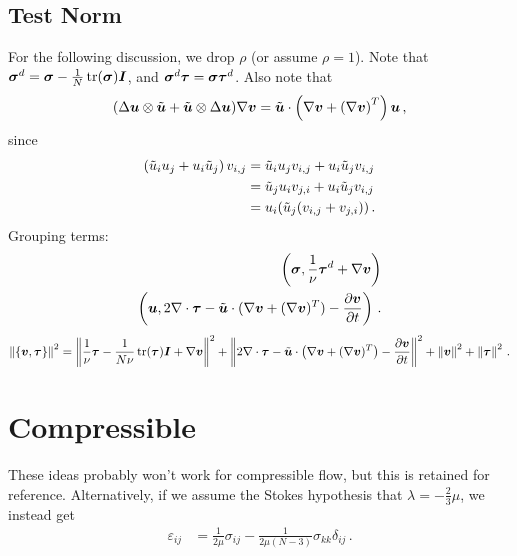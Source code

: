 \documentclass{article}
\begin{document}
\subsection*{Test Norm}
For the following discussion, we drop $\rho$ (or assume $\rho=1$).
Note that $\boldsymbol\sigma^d=\boldsymbol\sigma-\frac{1}{N}\operatorname*{tr}(\boldsymbol\sigma)\boldsymbol I$, and $\boldsymbol\sigma^d\boldsymbol\tau=\boldsymbol\sigma\boldsymbol\tau^d$.
Also note that 
\[
(\Delta\boldsymbol u\otimes\tilde{\boldsymbol u}+\tilde{\boldsymbol u}\otimes\Delta\boldsymbol u)\nabla\boldsymbol v=\tilde{\boldsymbol u}\cdot\left( \nabla\boldsymbol v+\left( \nabla\boldsymbol v \right)^T \right)\boldsymbol u\,,
\]
since
\begin{align*}
  \left( \tilde u_i u_j+u_i\tilde u_j \right)v_{i,j}&=\tilde u_i u_j v_{i,j}+u_i \tilde u_j v_{i,j}\\
  &=\tilde u_j u_i v_{j,i}+u_i \tilde u_j v_{i,j}\\
  &=u_i(\tilde u_j(v_{i,j}+v_{j,i}))\,.
\end{align*}
Grouping terms:
\begin{align*}
\left( \boldsymbol\sigma,\frac{1}{\nu}\boldsymbol\tau^d+\nabla\boldsymbol v \right)\\
\left( \boldsymbol u,2\nabla\cdot\boldsymbol\tau-\tilde{\boldsymbol u}\cdot(\nabla\boldsymbol v+(\nabla\boldsymbol v)^T)-\frac{\partial\boldsymbol v}{\partial t} \right)\,.
\end{align*}
\begin{equation*}
\left\| \left\{ \boldsymbol v,\boldsymbol\tau \right\} \right\|^2=\left\| \frac{1}{\nu}\boldsymbol\tau-\frac{1}{N\nu}\operatorname*{tr}(\boldsymbol\tau)\boldsymbol I+\nabla\boldsymbol v \right\|^2
+\left\| 2\nabla\cdot\boldsymbol\tau-\tilde{\boldsymbol u}\cdot\left( \nabla\boldsymbol v+(\nabla\boldsymbol v)^T \right)-\frac{\partial\boldsymbol v}{\partial t} \right\|^2
+\left\| \boldsymbol v \right\|^2
+\left\| \boldsymbol\tau \right\|^2\,.
\end{equation*}

\section*{Compressible}
These ideas probably won't work for compressible flow, but this is retained for reference.
Alternatively, if we assume the Stokes hypothesis that $\lambda=-\frac{2}{3}\mu$, we instead get
\begin{align*}
  \varepsilon_{ij}&=\frac{1}{2\mu}\sigma_{ij}-\frac{1}{2\mu(N-3)}\sigma_{kk}\delta_{ij}\,.
\end{align*}
\end{document}
